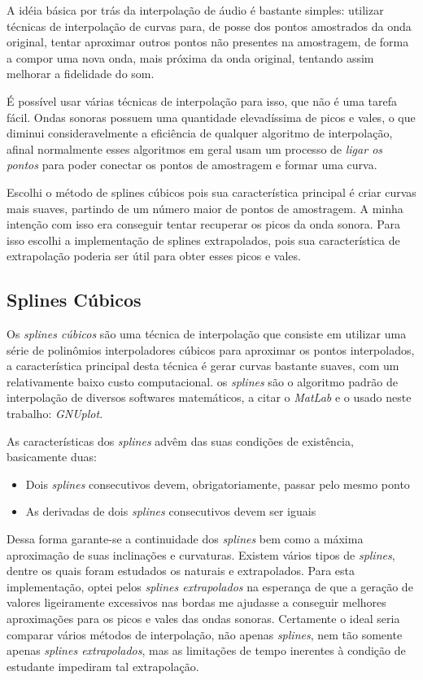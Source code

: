 A idéia básica por trás da interpolação de áudio é bastante simples: utilizar técnicas de interpolação de curvas para, de posse dos pontos amostrados da onda original, tentar aproximar outros pontos não presentes na amostragem, de forma a compor uma nova onda, mais próxima da onda original, tentando assim melhorar a fidelidade do som. 

É possível usar várias técnicas de interpolação para isso, que não é uma tarefa fácil. Ondas sonoras possuem uma quantidade elevadíssima de picos e vales, o que diminui consideravelmente a eficiência de qualquer algoritmo de interpolação, afinal normalmente esses algoritmos em geral usam um processo de \emph{ligar os pontos} para poder conectar os pontos de amostragem e formar uma curva.

Escolhi o método de splines cúbicos pois sua característica principal é criar curvas mais suaves, partindo de um número maior de pontos de amostragem. A minha intenção com isso era conseguir tentar recuperar os picos da onda sonora. Para isso escolhi a implementação de splines extrapolados, pois sua característica de extrapolação poderia ser útil para obter esses picos e vales.

\subsection{Splines Cúbicos}

Os \textit{splines cúbicos} são uma técnica de interpolação que consiste em utilizar uma série de polinômios interpoladores cúbicos para aproximar os pontos interpolados, a característica principal desta técnica é gerar curvas bastante suaves, com um relativamente baixo custo computacional. os \textit{splines} são o algoritmo padrão de interpolação de diversos softwares matemáticos, a citar o \emph{MatLab} e o usado neste trabalho: \emph{GNUplot}.

As características dos \textit{splines} advêm das suas condições de existência, basicamente duas:

\begin{itemize}{}{}
\item Dois \textit{splines} consecutivos devem, obrigatoriamente, passar pelo mesmo ponto
\item As derivadas de dois \textit{splines} consecutivos devem ser iguais
\end{itemize}

Dessa forma garante-se a continuidade dos \textit{splines} bem como a máxima aproximação de suas inclinações e curvaturas. Existem vários tipos de \textit{splines}, dentre os quais foram estudados os naturais e extrapolados. Para esta implementação, optei pelos \textit{splines extrapolados} na esperança de que a geração de valores ligeiramente excessivos nas bordas me ajudasse a conseguir melhores aproximações para os picos e vales das ondas sonoras. Certamente o ideal seria comparar vários métodos de interpolação, não apenas \textit{splines}, nem tão somente apenas \textit{splines extrapolados}, mas as limitações de tempo inerentes à condição de estudante impediram tal extrapolação.

